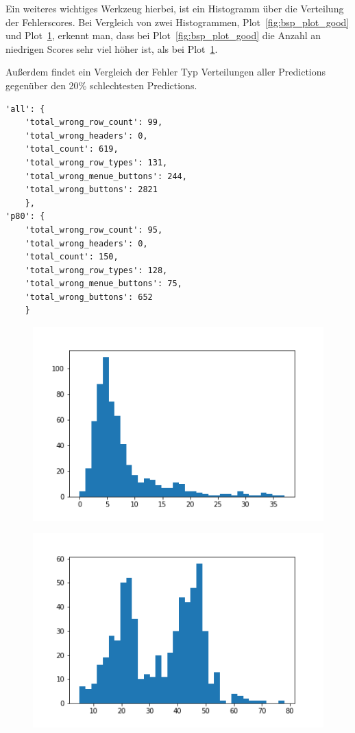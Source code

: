 \documentclass[pdftex,a4paper,halfparskip, article]{scrartcl}
\begin{document}
Ein weiteres wichtiges Werkzeug hierbei, ist ein Histogramm über die Verteilung der Fehlerscores. Bei Vergleich von zwei Histogrammen, Plot~\ref{fig:bsp_plot_good} und Plot~\ref{fig:bsp_plot_bad}, erkennt man, dass bei Plot~\ref{fig:bsp_plot_good} die Anzahl an niedrigen Scores sehr viel höher ist, als bei Plot~\ref{fig:bsp_plot_bad}.

Außerdem findet ein Vergleich der Fehler Typ Verteilungen aller Predictions gegenüber den 20\% schlechtesten Predictions.

\begin{verbatim}
'all': {
    'total_wrong_row_count': 99,
    'total_wrong_headers': 0, 
    'total_count': 619, 
    'total_wrong_row_types': 131, 
    'total_wrong_menue_buttons': 244, 
    'total_wrong_buttons': 2821
    },
'p80': {
    'total_wrong_row_count': 95, 
    'total_wrong_headers': 0, 
    'total_count': 150, 
    'total_wrong_row_types': 128, 
    'total_wrong_menue_buttons': 75, 
    'total_wrong_buttons': 652
    }
\end{verbatim}

\begin{figure}
\centering
\begin{minipage}{.5\textwidth}
  \centering
  \includegraphics[width=.8\linewidth]{predictions_bin10_histogramm}
  \label{fig:bsp_plot_good}
\end{minipage}%
\begin{minipage}{.5\textwidth}
  \centering
  \includegraphics[width=.8\linewidth]{predictions_bin12_histogramm}
  \label{fig:bsp_plot_bad}
\end{minipage}
\end{figure}
\end{document}
